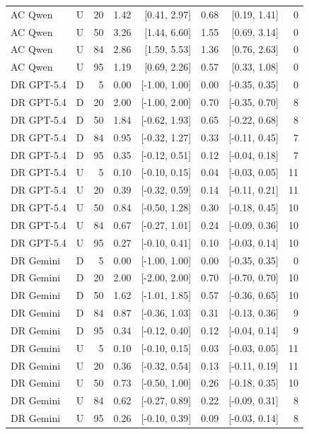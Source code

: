 \begin{table}[!ht]
\begin{tabular}{llrrrrrr}
AC Qwen & U & 20 & 1.42 & [0.41, 2.97] & 0.68 & [0.19, 1.41] & 0 \\
AC Qwen & U & 50 & 3.26 & [1.44, 6.60] & 1.55 & [0.69, 3.14] & 0 \\
AC Qwen & U & 84 & 2.86 & [1.59, 5.53] & 1.36 & [0.76, 2.63] & 0 \\
AC Qwen & U & 95 & 1.19 & [0.69, 2.26] & 0.57 & [0.33, 1.08] & 0 \\
DR GPT-5.4 & D & 5 & 0.00 & [-1.00, 1.00] & 0.00 & [-0.35, 0.35] & 0 \\
DR GPT-5.4 & D & 20 & 2.00 & [-1.00, 2.00] & 0.70 & [-0.35, 0.70] & 8 \\
DR GPT-5.4 & D & 50 & 1.84 & [-0.62, 1.93] & 0.65 & [-0.22, 0.68] & 8 \\
DR GPT-5.4 & D & 84 & 0.95 & [-0.32, 1.27] & 0.33 & [-0.11, 0.45] & 7 \\
DR GPT-5.4 & D & 95 & 0.35 & [-0.12, 0.51] & 0.12 & [-0.04, 0.18] & 7 \\
DR GPT-5.4 & U & 5 & 0.10 & [-0.10, 0.15] & 0.04 & [-0.03, 0.05] & 11 \\
DR GPT-5.4 & U & 20 & 0.39 & [-0.32, 0.59] & 0.14 & [-0.11, 0.21] & 11 \\
DR GPT-5.4 & U & 50 & 0.84 & [-0.50, 1.28] & 0.30 & [-0.18, 0.45] & 10 \\
DR GPT-5.4 & U & 84 & 0.67 & [-0.27, 1.01] & 0.24 & [-0.09, 0.36] & 10 \\
DR GPT-5.4 & U & 95 & 0.27 & [-0.10, 0.41] & 0.10 & [-0.03, 0.14] & 10 \\
DR Gemini & D & 5 & 0.00 & [-1.00, 1.00] & 0.00 & [-0.35, 0.35] & 0 \\
DR Gemini & D & 20 & 2.00 & [-2.00, 2.00] & 0.70 & [-0.70, 0.70] & 10 \\
DR Gemini & D & 50 & 1.62 & [-1.01, 1.85] & 0.57 & [-0.36, 0.65] & 10 \\
DR Gemini & D & 84 & 0.87 & [-0.36, 1.03] & 0.31 & [-0.13, 0.36] & 9 \\
DR Gemini & D & 95 & 0.34 & [-0.12, 0.40] & 0.12 & [-0.04, 0.14] & 9 \\
DR Gemini & U & 5 & 0.10 & [-0.10, 0.15] & 0.03 & [-0.03, 0.05] & 11 \\
DR Gemini & U & 20 & 0.36 & [-0.32, 0.54] & 0.13 & [-0.11, 0.19] & 11 \\
DR Gemini & U & 50 & 0.73 & [-0.50, 1.00] & 0.26 & [-0.18, 0.35] & 10 \\
DR Gemini & U & 84 & 0.62 & [-0.27, 0.89] & 0.22 & [-0.09, 0.31] & 8 \\
DR Gemini & U & 95 & 0.26 & [-0.10, 0.39] & 0.09 & [-0.03, 0.14] & 8 \\
\bottomrule
\end{tabular}
\end{table}

